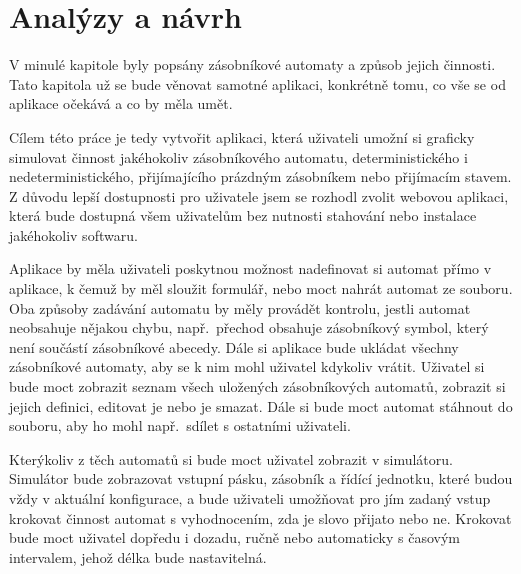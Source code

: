 \chapter{Analýzy a návrh}\label{chap:AppSpecifications}

V minulé kapitole byly popsány zásobníkové automaty a způsob jejich činnosti. Tato kapitola už se bude věnovat samotné aplikaci, konkrétně tomu, co vše se od aplikace očekává a co by měla umět.

Cílem této práce je tedy vytvořit aplikaci, která uživateli umožní si graficky simulovat činnost jakéhokoliv zásobníkového automatu, deterministického i nedeterministického, přijímajícího prázdným zásobníkem nebo přijímacím stavem. Z důvodu lepší dostupnosti pro uživatele jsem se rozhodl zvolit webovou aplikaci, která bude dostupná všem uživatelům bez nutnosti stahování nebo instalace jakéhokoliv softwaru. 

Aplikace by měla uživateli poskytnou možnost nadefinovat si automat přímo v aplikace, k čemuž by měl sloužit formulář, nebo moct nahrát automat ze souboru. Oba způsoby zadávání automatu by měly provádět kontrolu, jestli automat neobsahuje nějakou chybu, např.~přechod obsahuje zásobníkový symbol, který není součástí zásobníkové abecedy. 
Dále si aplikace bude ukládat všechny zásobníkové automaty, aby se k nim mohl uživatel kdykoliv vrátit. Uživatel si bude moct zobrazit seznam všech uložených zásobníkových automatů, zobrazit si jejich definici, editovat je nebo je smazat. Dále si bude moct automat stáhnout do souboru, aby ho mohl např.~sdílet s ostatními uživateli. 

Kterýkoliv z těch automatů si bude moct uživatel zobrazit v simulátoru. Simulátor bude zobrazovat vstupní pásku, zásobník a řídící jednotku, které budou vždy v aktuální konfigurace, a bude uživateli umožňovat pro jím zadaný vstup krokovat činnost automat s vyhodnocením, zda je slovo přijato nebo ne. Krokovat bude moct uživatel dopředu i dozadu, ručně nebo automaticky s časovým intervalem, jehož délka bude nastavitelná.
\endinput